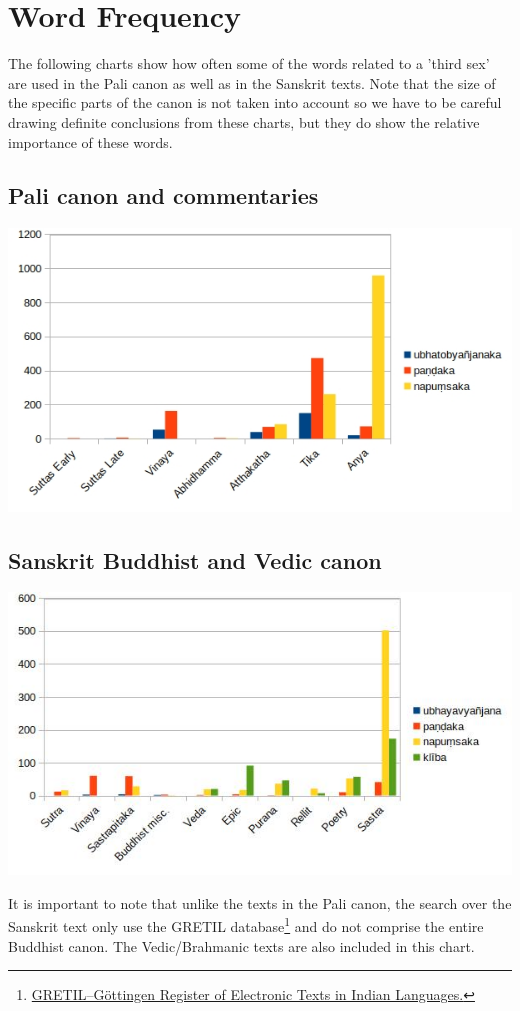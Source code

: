 \section{Word Frequency}
\label{appendix2}

The following charts show how often some of the words related to a 'third sex' are used in the Pali canon as well as in the Sanskrit texts. Note that the size of the specific parts of the canon is not taken into account so we have to be careful drawing definite conclusions from these charts, but they do show the relative importance of these words. 

\subsection{Pali canon and commentaries}

\includegraphics[width=0.7\linewidth]{pali.jpg}
\label{pali1}

\subsection{Sanskrit Buddhist and Vedic canon}

\includegraphics[width=0.7\linewidth]{sanskrit.jpg}
\label{sanskrit1}

\medskip
It is important to note that unlike the texts in the Pali canon, the search over the Sanskrit text only use the GRETIL database\footnote{\href{http://gretil.sub.uni-goettingen.de/gretil.html}{GRETIL--Göttingen Register of Electronic Texts in Indian Languages.}} and do not comprise the entire Buddhist canon. The Vedic/Brahmanic texts are also included in this chart.
